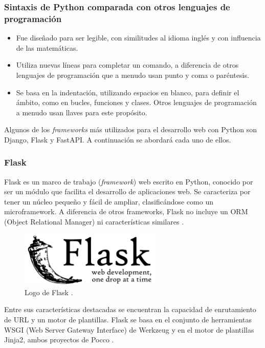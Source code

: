 \subsubsection{Sintaxis de Python comparada con otros lenguajes de programación}
\begin{itemize}
  \item Fue diseñado para ser legible, con similitudes al idioma inglés y con influencia de las matemáticas.
  \item Utiliza nuevas líneas para completar un comando, a diferencia de otros lenguajes de programación que a menudo usan punto y coma o paréntesis.
  \item Se basa en la indentación, utilizando espacios en blanco, para definir el ámbito, como en bucles, funciones y clases. Otros lenguajes de programación a menudo usan llaves para este propósito.
\end{itemize}

Algunos de los \textit{frameworks} más utilizados para el desarrollo web con Python
son Django, Flask y FastAPI. A continuación se abordará cada uno de ellos.

\subsubsection{Flask}

Flask es un marco de trabajo (\textit{framework}) web escrito en Python, conocido por
ser un módulo que facilita el desarrollo de aplicaciones web. Se caracteriza por
tener un núcleo pequeño y fácil de ampliar, clasificándose como un microframework.
A diferencia de otros frameworks, Flask no incluye un ORM (Object Relational Manager)
ni características similares \cite{Flask_Documentation}.

\begin{figure}[!htbp]
  \centering
  \includegraphics[width=0.6\textwidth]{imagenes/02-marco-teorico/logo-flask.png}
  \caption[Logo de Flask]{Logo de Flask \cite{Flask_Documentation}.}
  \label{fig:flask-logo}
\end{figure}

Entre sus características destacadas se encuentran la capacidad de enrutamiento
de URL y un motor de plantillas. Flask se basa en el conjunto de herramientas WSGI
(Web Server Gateway Interface) de Werkzeug y en el motor de plantillas Jinja2,
ambos proyectos de Pocco \cite{Python_Basics_Flask}.

